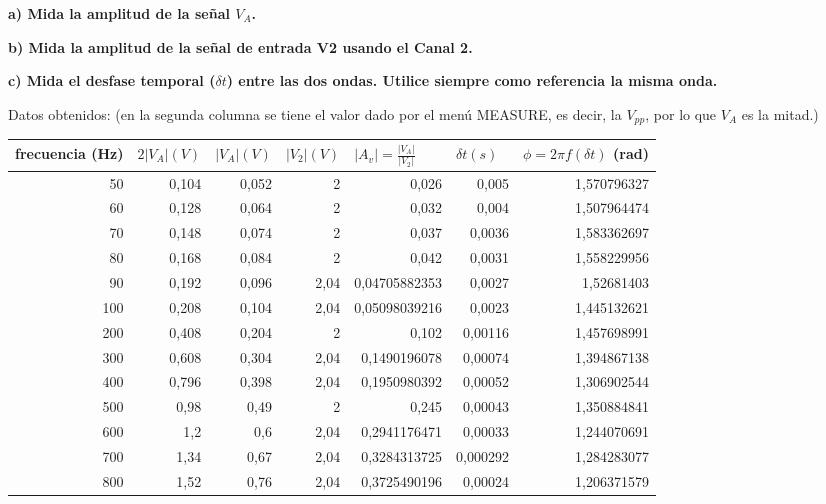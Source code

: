 \documentclass{article}
\begin{document}
\textbf{a) Mida la amplitud de la señal $V_A$.}

\textbf{b) Mida la amplitud de la señal de entrada V2 usando el Canal 2.}
 
\textbf{c) Mida el  desfase  temporal ($\delta t$)  entre  las  dos  ondas. Utilice  siempre  como referencia la misma onda.}

Datos obtenidos: (en la segunda columna se tiene el valor dado por el menú MEASURE, es decir, la $V_{pp}$, por lo que $V_A$ es la mitad.)

\begin{table}[h]
\centering
\begin{tabular}{|r|r|r|r|r|r|r|}
\hline
\multicolumn{1}{|l|}{frecuencia (Hz)} & \multicolumn{1}{l|}{$2|V_A|(V)$} & \multicolumn{1}{l|}{$|V_A|(V)$} & \multicolumn{1}{l|}{$|V_2|(V)$} & \multicolumn{1}{l|}{$|A_v|=\frac{|V_A|}{|V_2|}$} & \multicolumn{1}{l|}{$\delta t(s)$} & \multicolumn{1}{l|}{$\phi=2\pi f (\delta t)$ (rad)} \\
\hline
50    & 0,104 & 0,052 & 2    & 0,026         & 0,005      & 1,570796327   \\ \hline
60    & 0,128 & 0,064 & 2    & 0,032         & 0,004      & 1,507964474   \\ \hline
70    & 0,148 & 0,074 & 2    & 0,037         & 0,0036     & 1,583362697   \\ \hline
80    & 0,168 & 0,084 & 2    & 0,042         & 0,0031     & 1,558229956   \\ \hline
90    & 0,192 & 0,096 & 2,04 & 0,04705882353 & 0,0027     & 1,52681403    \\ \hline
100   & 0,208 & 0,104 & 2,04 & 0,05098039216 & 0,0023     & 1,445132621   \\ \hline
200   & 0,408 & 0,204 & 2    & 0,102         & 0,00116    & 1,457698991   \\ \hline
300   & 0,608 & 0,304 & 2,04 & 0,1490196078  & 0,00074    & 1,394867138   \\ \hline
400   & 0,796 & 0,398 & 2,04 & 0,1950980392  & 0,00052    & 1,306902544   \\ \hline
500   & 0,98  & 0,49  & 2    & 0,245         & 0,00043    & 1,350884841   \\ \hline
600   & 1,2   & 0,6   & 2,04 & 0,2941176471  & 0,00033    & 1,244070691   \\ \hline
700   & 1,34  & 0,67  & 2,04 & 0,3284313725  & 0,000292   & 1,284283077   \\ \hline
800   & 1,52  & 0,76  & 2,04 & 0,3725490196  & 0,00024    & 1,206371579   \\ \hline

\end{tabular}
\end{table}
\end{document}
